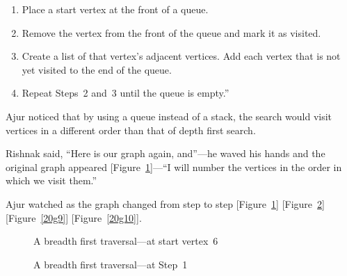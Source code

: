 \begin{enumerate}
    \item Place a start vertex at the front of a queue.
    \item Remove the vertex from the front of the queue and mark it as visited.
    \item Create a list of that vertex's adjacent vertices. Add each vertex that is not yet visited to the end of the queue.
    \item Repeat Steps~2 and~3 until the queue is empty.''
\end{enumerate}

Ajur noticed that by using a queue instead of a stack, the search would visit vertices in a different order than that of depth first search. 

Rishnak said, ``Here is our graph again, and''---he waved his hands and the original graph appeared [Figure~\ref{20g7}]---``I will number the vertices in the order in which we visit them.''

Ajur watched as the graph changed from step to step [Figure~\ref{20g7}] [Figure~\ref{20g8}] [Figure~\ref{20g9}] [Figure~\ref{20g10}].

\begin{figure}
\begin{center}
\caption{A breadth first traversal---at start vertex~6}\label{20g7}
\end{center}
\end{figure}


\begin{figure}
\begin{center}
\caption{A breadth first traversal---at Step~1}\label{20g8}
\end{center}
\end{figure}

